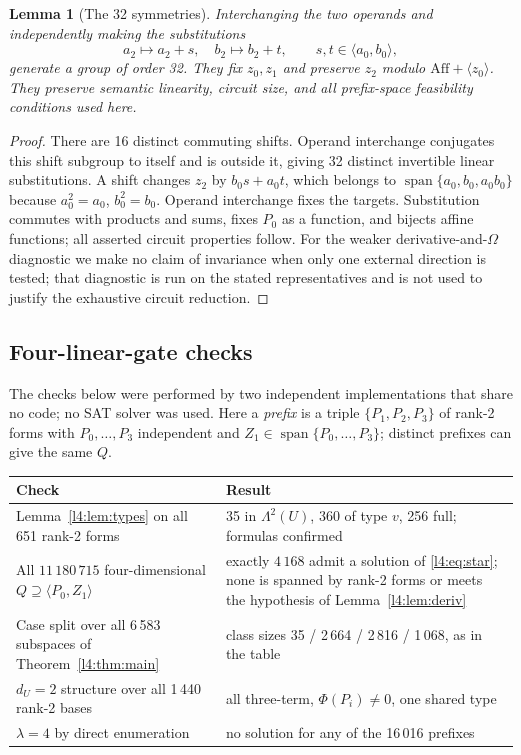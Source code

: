 \documentclass[11pt,a4paper]{article}
\theoremstyle{plain}
\newtheorem{lemma}[theorem]{Lemma}
\theoremstyle{remark}
\newcommand{\Aff}{\mathrm{Aff}}
\newcommand{\Span}{\operatorname{span}}
\newcommand{\Lam}{\Lambda^2}
\newcommand{\dU}{d_U}
\begin{document}
\begin{lemma}[The 32 symmetries]\label{l2:lem:sym}
Interchanging the two operands and independently making the substitutions
\[
a_2\mapsto a_2+s,\quad b_2\mapsto b_2+t,
\qquad s,t\in\langle a_0,b_0\rangle,
\]
generate a group of order 32. They fix $z_0,z_1$ and preserve $z_2$ modulo $\Aff+\langle z_0\rangle$. They preserve semantic linearity, circuit size, and all prefix-space feasibility conditions used here.
\end{lemma}
\begin{proof}
There are 16 distinct commuting shifts. Operand interchange conjugates this shift subgroup to itself and is outside it, giving 32 distinct invertible linear substitutions. A shift changes $z_2$ by $b_0s+a_0t$, which belongs to $\Span\{a_0,b_0,a_0b_0\}$ because $a_0^2=a_0$, $b_0^2=b_0$. Operand interchange fixes the targets. Substitution commutes with products and sums, fixes $P_0$ as a function, and bijects affine functions; all asserted circuit properties follow. For the weaker derivative-and-$\Omega$ diagnostic we make no claim of invariance when only one external direction is tested; that diagnostic is run on the stated representatives and is not used to justify the exhaustive circuit reduction.
\end{proof}

\subsection{Four-linear-gate checks}


The checks below were performed by two independent implementations that share no code; no SAT solver was used. Here a \emph{prefix} is a triple $\{P_1,P_2,P_3\}$ of rank-2 forms with $P_0,\dots,P_3$ independent and $Z_1\in\Span\{P_0,\dots,P_3\}$; distinct prefixes can give the same $Q$.

\begin{center}
\begin{tabularx}{0.95\textwidth}{@{}X X@{}}
\toprule
Check & Result \\
\midrule
Lemma~\ref{l4:lem:types} on all 651 rank-2 forms & 35 in $\Lam(U)$, 360 of type $v$, 256 full; formulas confirmed\\
All $11\,180\,715$ four-dimensional $Q\supseteq\langle P_0,Z_1\rangle$ & exactly $4\,168$ admit a solution of \eqref{l4:eq:star}; none is spanned by rank-2 forms or meets the hypothesis of Lemma~\ref{l4:lem:deriv}\\
Case split over all 6\,583 subspaces of Theorem~\ref{l4:thm:main} & class sizes 35 / 2\,664 / 2\,816 / 1\,068, as in the table\\
$\dU=2$ structure over all 1\,440 rank-2 bases & all three-term, $\Phi(P_i)\ne0$, one shared type\\
$\lambda=4$ by direct enumeration & no solution for any of the 16\,016 prefixes\\
\bottomrule
\end{tabularx}
\end{center}
\end{document}
